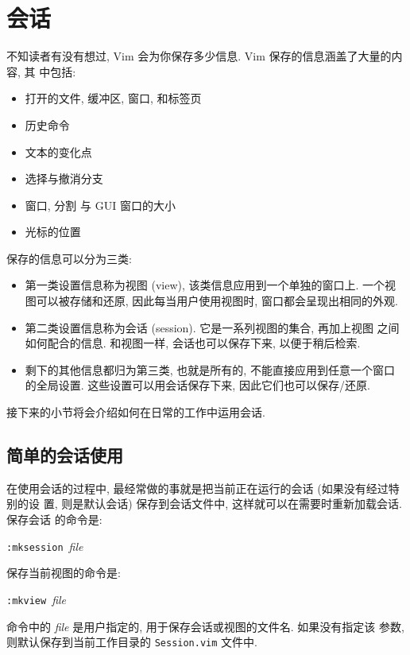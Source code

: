 \section{会话}
\label{sec:using_sessions}

不知读者有没有想过, Vim 会为你保存多少信息. Vim 保存的信息涵盖了大量的内容, 其
中包括:
\begin{itemize}
    \item 打开的文件, 缓冲区, 窗口, 和标签页
    \item 历史命令
    \item 文本的变化点
    \item 选择与撤消分支
    \item 窗口, 分割 与 GUI 窗口的大小
    \item 光标的位置
\end{itemize}

保存的信息可以分为三类:
\begin{itemize}
    \item 第一类设置信息称为视图 (view), 该类信息应用到一个单独的窗口上. 一个视
        图可以被存储和还原, 因此每当用户使用视图时, 窗口都会呈现出相同的外观.
    \item 第二类设置信息称为会话 (session). 它是一系列视图的集合, 再加上视图
        之间如何配合的信息. 和视图一样, 会话也可以保存下来, 以便于稍后检索.
    \item 剩下的其他信息都归为第三类, 也就是所有的, 不能直接应用到任意一个窗口
        的全局设置. 这些设置可以用会话保存下来, 因此它们也可以保存/还原.
\end{itemize}

接下来的小节将会介绍如何在日常的工作中运用会话.

\subsection{简单的会话使用}
\label{subsec:simple_session_usage}

在使用会话的过程中, 最经常做的事就是把当前正在运行的会话 (如果没有经过特别的设
置, 则是默认会话) 保存到会话文件中, 这样就可以在需要时重新加载会话. 保存会话
的命令是:
\begin{vimcmdform}
\texttt{:mksession}\ \textit{file}
\end{vimcmdform}
保存当前视图的命令是:
\begin{vimcmdform}
\texttt{:mkview}\ \textit{file}
\end{vimcmdform}
命令中的 \textit{file} 是用户指定的, 用于保存会话或视图的文件名. 如果没有指定该
参数, 则默认保存到当前工作目录的 \texttt{Session.vim} 文件中.

